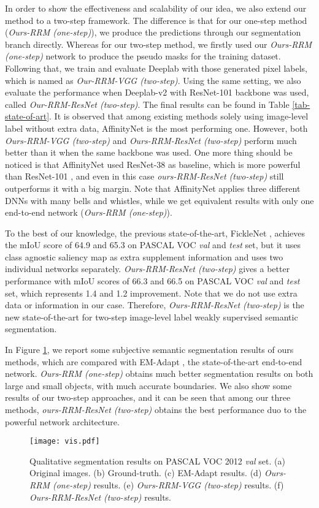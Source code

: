 \documentclass[letterpaper]{article} \usepackage{aaai20}  \usepackage{times}  \usepackage{helvet} \usepackage{courier}  \usepackage[hyphens]{url}  \usepackage{graphicx} \urlstyle{rm} \def\UrlFont{\rm}  \usepackage{graphicx}  \frenchspacing  \setlength{\pdfpagewidth}{8.5in}  \setlength{\pdfpageheight}{11in}
\begin{document}
In order to show the effectiveness and scalability of our idea, we also extend our method to a two-step framework. The difference is that for our one-step method 
(\emph{Ours-RRM (one-step)}), we produce the predictions through our segmentation branch directly. Whereas for our two-step method, we firstly used our \emph{Ours-RRM (one-step)} network to produce the pseudo masks for the training dataset.
Following that, we train and evaluate Deeplab \cite{chen2014semantic} with those generated pixel labels, which is named as \emph{Our-RRM-VGG (two-step)}. Using the same setting, we also evaluate the performance when Deeplab-v2 \cite{chen2018deeplab} with ResNet-101 backbone was used, called \emph{Our-RRM-ResNet (two-step)}.
The final results can be found in Table \ref{tab-state-of-art}. It is observed that among existing methods solely using image-level label without extra data, AffinityNet \cite{ahn2018learning} is the most performing one. However, both \emph{Ours-RRM-VGG (two-step)} and \emph{Ours-RRM-ResNet (two-step)} perform much better than it when the same backbone was used. One more thing should be noticed is that AffinityNet \cite{ahn2018learning} used ResNet-38 \cite{wu2019wider} as baseline, which is more powerful than ResNet-101 \cite{lee2019ficklenet}, and even in this case \emph{ours-RRM-ResNet (two-step)} still outperforms it with a big margin. 
Note that AffinityNet \cite{ahn2018learning} applies three different DNNs with many bells and whistles, while we get equivalent results with only one end-to-end network (\emph{Ours-RRM (one-step)}).  

To the best of our knowledge, the previous state-of-the-art, FickleNet \cite{lee2019ficklenet},  achieves the mIoU score of 64.9 and 65.3 on PASCAL VOC \emph{val} and \emph{test} set, but it uses class agnostic saliency map \cite{liu2010learning} as extra supplement information and uses two individual networks separately. \emph{Ours-RRM-ResNet (two-step)} gives a better performance with mIoU scores of 66.3 and 66.5 on PASCAL VOC \emph{val} and \emph{test} set, which represents 1.4 and 1.2 improvement. Note that we do not use extra data or information in our case. Therefore, \emph{Ours-RRM-ResNet (two-step)} is the new state-of-the-art for two-step image-level label weakly supervised semantic segmentation. 

In Figure \ref{vis}, we report some subjective semantic segmentation results of ours methods, which are compared with EM-Adapt \cite{papandreou1502weakly}, the state-of-the-art end-to-end network.  \emph{Ours-RRM (one-step)} obtains much better segmentation results on both large and small objects, with much accurate boundaries. We also show some results of our two-step approaches, and it can be seen that among our three methods, \emph{ours-RRM-ResNet (two-step)} obtains the best performance duo to the powerful network architecture.
 \begin{figure}[hb]
 	\centering
 	\texttt{[image: vis.pdf]}
 	\caption{Qualitative segmentation results on PASCAL VOC 2012 \emph{val} set. (a) Original images. (b) Ground-truth. (c) EM-Adapt results. (d) \emph{Ours-RRM (one-step)} results. (e) \emph{Ours-RRM-VGG (two-step)} results. (f) \emph{Ours-RRM-ResNet (two-step)} results.}
 	\label{vis}
 \end{figure}
\end{document}
